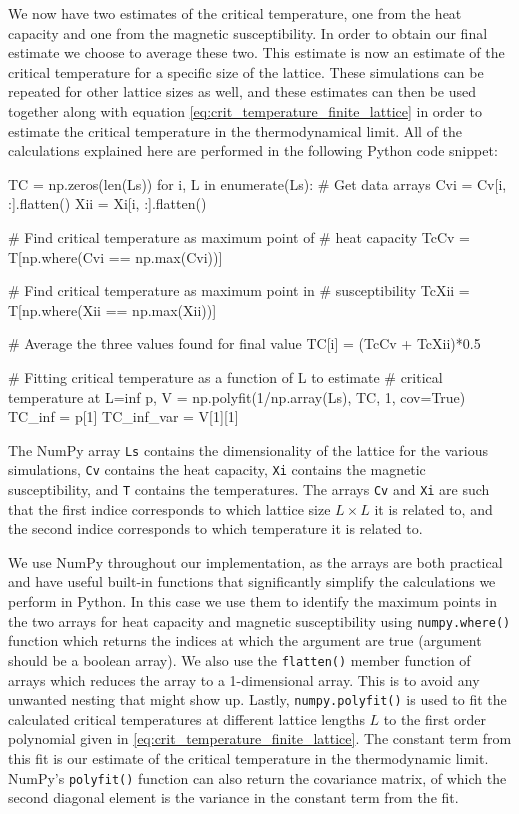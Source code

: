 \documentclass[reprint,english,notitlepage]{revtex4-1}  %
\begin{document}
We now have two estimates of the critical temperature, one from the heat capacity and one from the magnetic susceptibility. In order to obtain our final estimate we choose to average these two. This estimate is now an estimate of the critical temperature for a specific size of the lattice. These simulations can be repeated for other lattice sizes as well, and these estimates can then be used together along with equation \eqref{eq:crit_temperature_finite_lattice} in order to estimate the critical temperature in the thermodynamical limit. All of the calculations explained here are performed in the following Python code snippet:

\begin{python}
TC = np.zeros(len(Ls))
for i, L in enumerate(Ls):
    # Get data arrays
    Cvi = Cv[i, :].flatten()
    Xii = Xi[i, :].flatten()

    # Find critical temperature as maximum point of
    # heat capacity
    TcCv = T[np.where(Cvi == np.max(Cvi))]

    # Find critical temperature as maximum point in
    # susceptibility
    TcXii = T[np.where(Xii == np.max(Xii))]
    
    # Average the three values found for final value
    TC[i] = (TcCv + TcXii)*0.5

# Fitting critical temperature as a function of L to estimate
# critical temperature at L=inf
p, V = np.polyfit(1/np.array(Ls), TC, 1, cov=True)
TC_inf = p[1]
TC_inf_var = V[1][1]
\end{python} 

The NumPy \citep{numpy} array \verb+Ls+ contains the dimensionality of the lattice for the various simulations, \verb+Cv+ contains the heat capacity, \verb+Xi+ contains the magnetic susceptibility, and \verb+T+ contains the temperatures. The arrays \verb+Cv+ and \verb+Xi+ are such that the first indice corresponds to which lattice size $L \times L$ it is related to, and the second indice corresponds to which temperature it is related to.

We use NumPy throughout our implementation, as the arrays are both practical and have useful built-in functions that significantly simplify the calculations we perform in Python. In this case we use them to identify the maximum points in the two arrays for heat capacity and magnetic susceptibility using \verb+numpy.where()+ function which returns the indices at which the argument are true (argument should be a boolean array). We also use the \verb+flatten()+ member function of arrays which reduces the array to a 1-dimensional array. This is to avoid any unwanted nesting that might show up. Lastly, \verb+numpy.polyfit()+ is used to fit the calculated critical temperatures at different lattice lengths $L$ to the first order polynomial given in \eqref{eq:crit_temperature_finite_lattice}. The constant term from this fit is our estimate of the critical temperature in the thermodynamic limit. NumPy's \verb+polyfit()+ function can also return the covariance matrix, of which the second diagonal element is the variance in the constant term from the fit.
\end{document}
